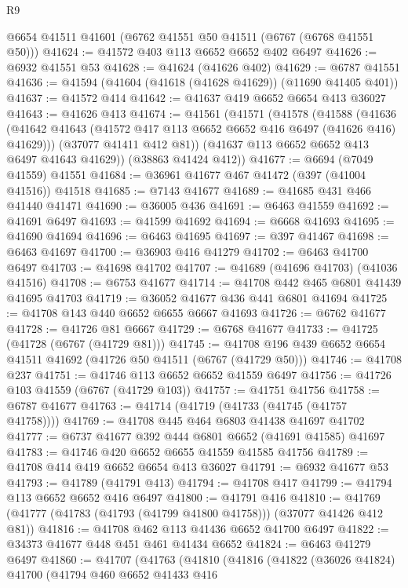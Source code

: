 \begin{lexlean}{R9}
\begin{coremodule}
    @6654
    @41511
    @41601
    (@6762 @41551 @50 @41511 (@6767 (@6768 @41551 @50)))
@41624 := @41572 @403 @113 @6652 @6652 @402 @6497
@41626 := @6932 @41551 @53
@41628 := @41624 (@41626 @402)
@41629 := @6787 @41551
@41636 := @41594 (@41604 (@41618 (@41628 @41629)) (@11690 @41405 @401))
@41637 := @41572 @414
@41642 := @41637 @419 @6652 @6654 @413 @36027
@41643 := @41626 @413
@41674 := @41561
    (@41571
      (@41578
        (@41588
          (@41636 (@41642 @41643 (@41572 @417 @113 @6652 @6652 @416 @6497 (@41626 @416) @41629)))
          (@37077 @41411 @412 @81))
        (@41637 @113 @6652 @6652 @413 @6497 @41643 @41629))
      (@38863 @41424 @412))
@41677 := @6694 (@7049 @41559) @41551
@41684 := @36961 @41677 @467 @41472 (@397 (@41004 @41516)) @41518
@41685 := @7143 @41677
@41689 := @41685 @431 @466 @41440 @41471
@41690 := @36005 @436
@41691 := @6463 @41559
@41692 := @41691 @6497
@41693 := @41599 @41692
@41694 := @6668 @41693
@41695 := @41690 @41694
@41696 := @6463 @41695
@41697 := @397 @41467
@41698 := @6463 @41697
@41700 := @36903 @416 @41279
@41702 := @6463 @41700 @6497
@41703 := @41698 @41702
@41707 := @41689 (@41696 @41703) (@41036 @41516)
@41708 := @6753 @41677
@41714 := @41708 @442 @465 @6801 @41439 @41695 @41703
@41719 := @36052 @41677 @436 @441 @6801 @41694
@41725 := @41708 @143 @440 @6652 @6655 @6667 @41693
@41726 := @6762 @41677
@41728 := @41726 @81 @6667
@41729 := @6768 @41677
@41733 := @41725 (@41728 (@6767 (@41729 @81)))
@41745 := @41708 @196 @439 @6652 @6654 @41511 @41692 (@41726 @50 @41511 (@6767 (@41729 @50)))
@41746 := @41708 @237
@41751 := @41746 @113 @6652 @6652 @41559 @6497
@41756 := @41726 @103 @41559 (@6767 (@41729 @103))
@41757 := @41751 @41756
@41758 := @6787 @41677
@41763 := @41714 (@41719 (@41733 (@41745 (@41757 @41758))))
@41769 := @41708 @445 @464 @6803 @41438 @41697 @41702
@41777 := @6737 @41677 @392 @444 @6801 @6652 (@41691 @41585) @41697
@41783 := @41746 @420 @6652 @6655 @41559 @41585 @41756
@41789 := @41708 @414 @419 @6652 @6654 @413 @36027
@41791 := @6932 @41677 @53
@41793 := @41789 (@41791 @413)
@41794 := @41708 @417
@41799 := @41794 @113 @6652 @6652 @416 @6497
@41800 := @41791 @416
@41810 := @41769 (@41777 (@41783 (@41793 (@41799 @41800 @41758))) (@37077 @41426 @412 @81))
@41816 := @41708 @462 @113 @41436 @6652 @41700 @6497
@41822 := @34373 @41677 @448 @451 @461 @41434 @6652
@41824 := @6463 @41279 @6497
@41860 := @41707
    (@41763
      (@41810
        (@41816
          (@41822
            (@36026 @41824)
            @41700
            (@41794
              @460
              @6652
              @41433
              @416

\end{coremodule}
\end{lexlean}
